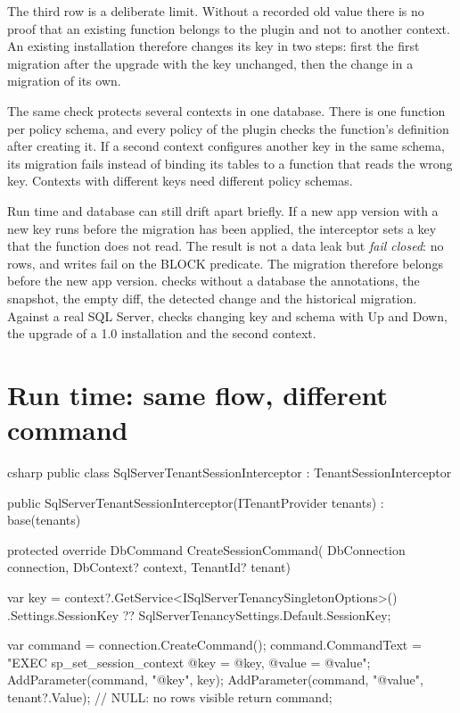 The third row is a deliberate limit. Without a recorded old value there is no proof that an
existing function belongs to the plugin and not to another context. An existing installation
therefore changes its key in two steps: first the first migration after the upgrade with the key
unchanged, then the change in a migration of its own.

The same check protects several contexts in one database. There is one function per policy
schema, and every policy of the plugin checks the function's definition after creating it. If a
second context configures another key in the same schema, its migration fails instead of binding
its tables to a function that reads the wrong key. Contexts with different keys need different
policy schemas.

Run time and database can still drift apart briefly. If a new app version with a new key runs
before the migration has been applied, the interceptor sets a key that the function does not
read. The result is not a data leak but \emph{fail closed}: no rows, and writes fail on the BLOCK
predicate. The migration therefore belongs before the new app version.
checks without a database the annotations, the snapshot, the empty diff, the detected change
and the historical migration. Against a real SQL Server,
 checks changing key and schema with Up and
Down, the upgrade of a 1.0 installation and the second context.

\section{Run time: same flow, different command}

\begin{sourcecode}{csharp}
public class SqlServerTenantSessionInterceptor : TenantSessionInterceptor
{
    public SqlServerTenantSessionInterceptor(ITenantProvider tenants)
        : base(tenants)
    {
    }

    protected override DbCommand CreateSessionCommand(
        DbConnection connection, DbContext? context, TenantId? tenant)
    {
        var key = context?.GetService<ISqlServerTenancySingletonOptions>()
                      .Settings.SessionKey
                  ?? SqlServerTenancySettings.Default.SessionKey;

        var command = connection.CreateCommand();
        command.CommandText = "EXEC sp_set_session_context @key = @key, @value = @value";
        AddParameter(command, "@key", key);
        AddParameter(command, "@value", tenant?.Value);    // NULL: no rows visible
        return command;
    }
}
\end{sourcecode}

